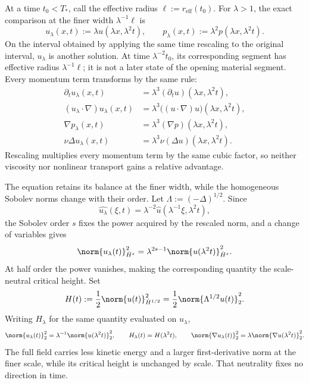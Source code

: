 
At a time \(t_0<T_*\), call the effective radius \(\ell:=r_{\mathrm{eff}}(t_0)\).
For \(\lambda>1\), the exact \NavierStokes{} comparison at the finer width \(\lambda^{-1}\ell\) is
\[
  u_\lambda(x,t)
  :=
  \lambda u(\lambda x,\lambda^2t),
  \qquad
  p_\lambda(x,t)
  :=
  \lambda^2p(\lambda x,\lambda^2t).
\]
On the interval obtained by applying the same time rescaling to the original interval, \(u_\lambda\) is another \NavierStokes{} solution.
At time \(\lambda^{-2}t_0\), its corresponding segment has effective radius \(\lambda^{-1}\ell\); it is not a later state of the opening material segment.
Every momentum term transforms by the same rule:
\[
\begin{aligned}
  \partial_tu_\lambda(x,t)
  &=
  \lambda^3(\partial_tu)(\lambda x,\lambda^2t),
  \\
  (u_\lambda\cdot\nabla)u_\lambda(x,t)
  &=
  \lambda^3\bigl((u\cdot\nabla)u\bigr)(\lambda x,\lambda^2t),
  \\
  \nabla p_\lambda(x,t)
  &=
  \lambda^3(\nabla p)(\lambda x,\lambda^2t),
  \\
  \nu\Delta u_\lambda(x,t)
  &=
  \lambda^3\nu(\Delta u)(\lambda x,\lambda^2t).
\end{aligned}
\]
Rescaling multiplies every momentum term by the same cubic factor, so neither viscosity nor nonlinear transport gains a relative advantage.


The equation retains its balance at the finer width, while the homogeneous Sobolev norms change with their order.
Let \(\Lambda:=(-\Delta)^{1/2}\).
Since
\[
  \widehat{u_\lambda}(\xi,t)
  =
  \lambda^{-2}\widehat u(\lambda^{-1}\xi,\lambda^2t),
\]
the Sobolev order \(s\) fixes the power acquired by the rescaled norm, and a change of variables gives
\[
  \norm{u_\lambda(t)}_{\dot H^s}^2
  =
  \lambda^{2s-1}
  \norm{u(\lambda^2t)}_{\dot H^s}^2.
\]
At half order the power vanishes, making the corresponding quantity the scale-neutral critical height.
Set
\[
  H(t)
  :=
  \frac12\norm{u(t)}_{\dot H^{1/2}}^2
  =
  \frac12\norm{\Lambda^{1/2}u(t)}_2^2.
\]
Writing \(H_\lambda\) for the same quantity evaluated on \(u_\lambda\),
\[
  \norm{u_\lambda(t)}_2^2
  =
  \lambda^{-1}\norm{u(\lambda^2t)}_2^2,
  \qquad
  H_\lambda(t)=H(\lambda^2t),
  \qquad
  \norm{\nabla u_\lambda(t)}_2^2
  =
  \lambda\norm{\nabla u(\lambda^2t)}_2^2.
\]
The full field carries less kinetic energy and a larger first-derivative norm at the finer scale, while its critical height is unchanged by scale.
That neutrality fixes no direction in time.


